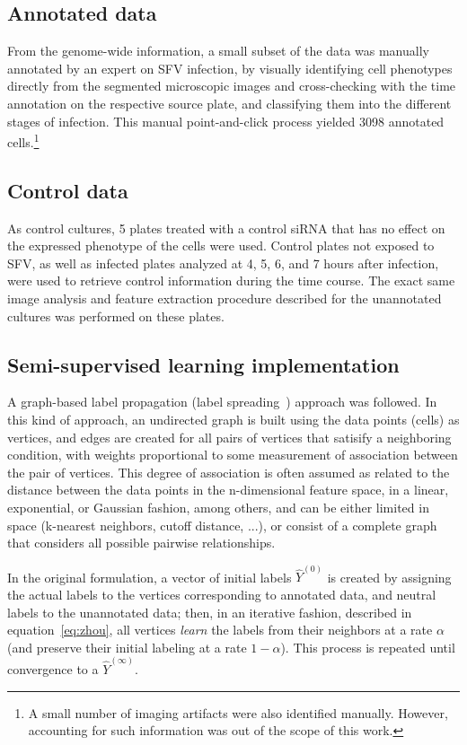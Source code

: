 \documentclass[oneside, a4paper, draft]{memoir} %
\begin{document}
\subsection{Annotated data}
From the genome-wide information, a small subset of the data was manually annotated by an expert on SFV infection, by
visually identifying cell phenotypes directly from the segmented microscopic images and cross-checking with the time
annotation on the respective source plate, and classifying them into the different stages of infection. This manual
point-and-click process yielded  3098 annotated cells.\footnote{A small number of
imaging artifacts were also identified manually. However, accounting for such information was out of the scope of
this work.}

\subsection{Control data}
As control cultures, 5 plates treated with a control siRNA that has no effect on the expressed phenotype of the cells
were used. Control plates not exposed to SFV, as well as infected plates analyzed at 4, 5, 6, and 7 hours after
infection, were used to retrieve control information during the time course. The exact same image analysis and
feature extraction procedure described for the unannotated cultures was performed on these plates. 

\subsection{Semi-supervised learning implementation}
A graph-based label propagation (label spreading~\cite{zhou2004learning}) approach was followed. In this kind of
approach, an undirected graph is built using the data points (cells) as vertices, and edges are created for all pairs
of vertices that satisify a neighboring condition, with weights proportional to some measurement of association
between the pair of vertices. This degree of association is often assumed as related to the distance
between the data points in the n-dimensional feature space, in a linear, exponential, or Gaussian fashion, among
others, and can be either limited in space (k-nearest neighbors, cutoff distance, ...), or consist of a
complete graph that considers all possible pairwise relationships.

In the original formulation, a vector of initial labels $\hat{Y}^{(0)}$ is created by assigning the actual labels 
to the vertices corresponding to annotated data, and neutral labels to the unannotated data; then, in an iterative
fashion, described in equation~\ref{eq:zhou}, all vertices \emph{learn} the labels from their neighbors at a
rate $\alpha$ (and preserve their initial labeling at a rate $1-\alpha$). This process is repeated until convergence
to a $\hat{Y}^{(\infty)}$.
\end{document}
